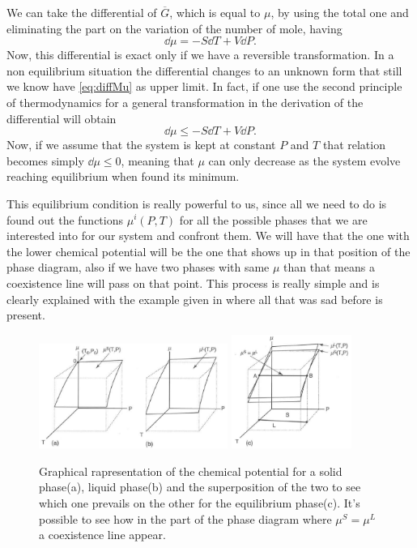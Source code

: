 {
    We can take the differential of $\overline{G}$, which is equal to $\mu$, by using the total one and eliminating the part on the variation of the number of mole, having
    \begin{equation}
        \label{eq:diffMu}
        \dd \mu = -S\dd T + V\dd P.
    \end{equation}
    Now, this differential is exact only if we have a reversible transformation. In a non equilibrium situation the differential changes to an unknown form that still we know have \eqref{eq:diffMu} as upper limit. In fact, if one use the second principle of thermodynamics for a general transformation in the derivation of the differential will obtain
    \begin{equation}
        \dd \mu \leq -S\dd T + V\dd P.
    \end{equation}
    Now, if we assume that the system is kept at constant $P$ and $T$ that relation becomes simply $\dd \mu \leq 0$, meaning that $\mu$ can only decrease as the system evolve reaching equilibrium when found its minimum.
}

\noindent
This equilibrium condition is really powerful to us, since all we need to do is found out the functions $\mu^i(P, T)$ for all the possible phases that we are interested into for our system and confront them. We will have that the one with the lower chemical potential will be the one that shows up in that position of the phase diagram, also if we have two phases with same $\mu$ than that means a coexistence line will pass on that point. This process is really simple and is clearly explained with the example given in  where all that was sad before is present.
\begin{figure}[t]
    \centering
    \includegraphics[width=0.55\textwidth]{Immagini/Musempl.png}
    \includegraphics[width=0.35\textwidth]{Immagini/TotMu.png}
    \caption{
        Graphical rapresentation of the chemical potential for a solid phase(a), liquid phase(b) and the superposition of the two to see which one prevails on the other for the equilibrium phase(c). It's possible to see how in the part of the phase diagram where $\mu^S = \mu^L$ a coexistence line appear.
    }
    \label{fig:MuComparison}
\end{figure}

